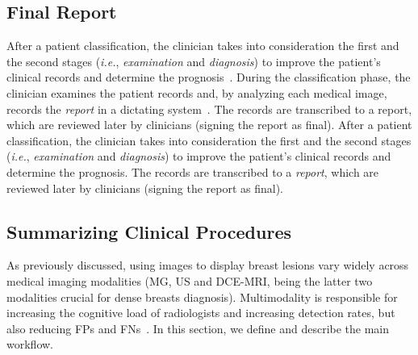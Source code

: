 
\subsection{Final Report}
\label{sec:chap002005003}

After a patient classification, the clinician takes into consideration the first and the second stages ({\it i.e.}, {\it examination} and {\it diagnosis}) to improve the patient's clinical records and determine the prognosis~\cite{segrelles2017increasing}.
During the classification phase, the clinician examines the patient records and, by analyzing each medical image, records the {\it report} in a dictating system~\cite{SENG202079}.
The records are transcribed to a report, which are reviewed later by clinicians (signing the report as final).
After a patient classification, the clinician takes into consideration the first and the second stages ({\it i.e.}, {\it examination} and {\it diagnosis}) to improve the patient's clinical records and determine the prognosis.
The records are transcribed to a {\it report}, which are reviewed later by clinicians (signing the report as final).

\subsection{Summarizing Clinical Procedures}
\label{sec:chap002005004}

As previously discussed, using images to display breast lesions vary widely across medical imaging modalities (\ac{MG}, \ac{US} and \ac{DCE}-\ac{MRI}, being the latter two modalities crucial for dense breasts diagnosis).
Multimodality is responsible for increasing the cognitive load of radiologists and increasing detection rates, but also reducing \acp{FP} and \acp{FN}~\cite{cheung2017integral}.
In this section, we define and describe the main workflow.


